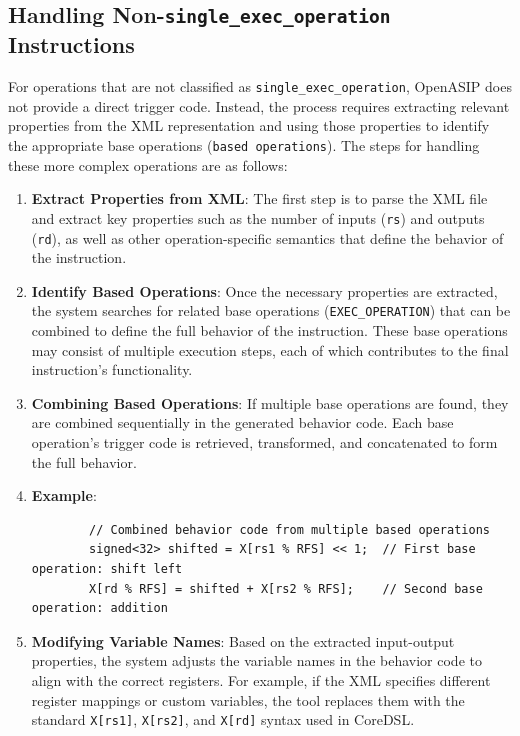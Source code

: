 \subsection{Handling Non-\texttt{single\_exec\_operation} Instructions}

For operations that are not classified as \texttt{single\_exec\_operation}, OpenASIP does not provide a direct trigger code. Instead, the process requires extracting relevant properties from the XML representation and using those properties to identify the appropriate base operations (\texttt{based operations}). The steps for handling these more complex operations are as follows:

\begin{enumerate}
    \item \textbf{Extract Properties from XML}: The first step is to parse the XML file and extract key properties such as the number of inputs (\texttt{rs}) and outputs (\texttt{rd}), as well as other operation-specific semantics that define the behavior of the instruction.

    \item \textbf{Identify Based Operations}: Once the necessary properties are extracted, the system searches for related base operations (\texttt{EXEC\_OPERATION}) that can be combined to define the full behavior of the instruction. These base operations may consist of multiple execution steps, each of which contributes to the final instruction's functionality.

    \item \textbf{Combining Based Operations}: If multiple base operations are found, they are combined sequentially in the generated behavior code. Each base operation's trigger code is retrieved, transformed, and concatenated to form the full behavior.

    \item \textbf{Example}:
    \begin{lstlisting}
        // Combined behavior code from multiple based operations
        signed<32> shifted = X[rs1 % RFS] << 1;  // First base operation: shift left
        X[rd % RFS] = shifted + X[rs2 % RFS];    // Second base operation: addition
    \end{lstlisting}

    \item \textbf{Modifying Variable Names}: Based on the extracted input-output properties, the system adjusts the variable names in the behavior code to align with the correct registers. For example, if the XML specifies different register mappings or custom variables, the tool replaces them with the standard \texttt{X[rs1]}, \texttt{X[rs2]}, and \texttt{X[rd]} syntax used in CoreDSL.
\end{enumerate}


